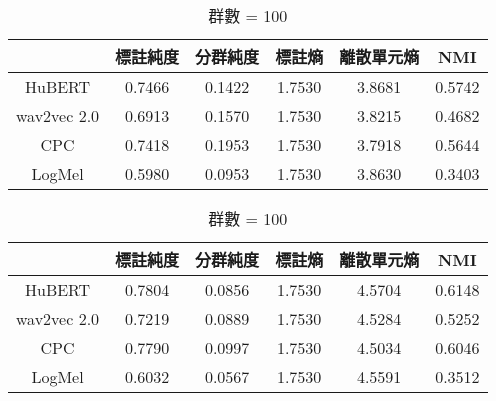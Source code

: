         \begin{table}[!htbp]
            \centering
            \begin{subtable}[t]{\textwidth}
                \centering
                \begin{tabular}{|c|c|c|c|c|c|} \hline 
                                & 標註純度 & 分群純度 & 標註熵 & 離散單元熵 &     NMI \\ \hline 
                    HuBERT      &           0.7466 &   0.1422 &         1.7530 &     3.8681 &  0.5742 \\ \hline    %
                    wav2vec 2.0 &           0.6913 &   0.1570 &         1.7530 &     3.8215 &  0.4682 \\ \hline    %
                    CPC         &           0.7418 &   0.1953 &         1.7530 &     3.7918 &  0.5644 \\ \hline    %
                    LogMel      &           0.5980 &   0.0953 &         1.7530 &     3.8630 &  0.3403 \\ \hline    %
                \end{tabular}
                \caption{群數 = 50}
                \label{tab:ch3-clu050}
            \end{subtable}        

            \vspace{0.2cm}        

            \begin{subtable}[t]{\textwidth}
                \centering
                \begin{tabular}{|c|c|c|c|c|c|} \hline 
                                & 標註純度 & 分群純度 & 標註熵 & 離散單元熵 &     NMI \\ \hline 
                    HuBERT      &           0.7804 &   0.0856 &         1.7530 &     4.5704 &  0.6148 \\ \hline    %
                    wav2vec 2.0 &           0.7219 &   0.0889 &         1.7530 &     4.5284 &  0.5252 \\ \hline    %
                    CPC         &           0.7790 &   0.0997 &         1.7530 &     4.5034 &  0.6046 \\ \hline    %
                    LogMel      &           0.6032 &   0.0567 &         1.7530 &     4.5591 &  0.3512 \\ \hline    %
                \end{tabular}
                \caption{群數 = 100}
                \label{tab:ch3-clu100}
            \end{subtable}        


\end{table}
